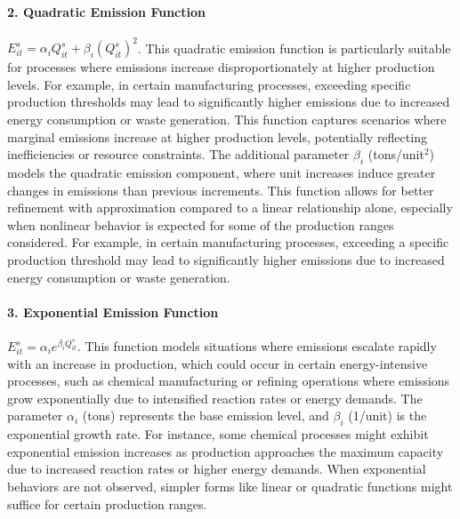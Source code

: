 \documentclass[final,3p,times,review,authoryear]{elsarticle}
\begin{document}
\paragraph{2. Quadratic Emission Function}
$E_{it}^s = \alpha_i Q_{it}^s + \beta_i (Q_{it}^s)^2$. This quadratic emission function is particularly suitable for processes where emissions increase disproportionately at higher production levels. For example, in certain manufacturing processes, exceeding specific production thresholds may lead to significantly higher emissions due to increased energy consumption or waste generation. This function captures scenarios where marginal emissions increase at higher production levels, potentially reflecting inefficiencies or resource constraints. The additional parameter $\beta_i$ (tons/unit$^2$) models the quadratic emission component, where unit increases induce greater changes in emissions than previous increments. This function allows for better refinement with approximation compared to a linear relationship alone, especially when nonlinear behavior is expected for some of the production ranges considered. For example, in certain manufacturing processes, exceeding a specific production threshold may lead to significantly higher emissions due to increased energy consumption or waste generation.

\paragraph{3. Exponential Emission Function}
$E_{it}^s = \alpha_i e^{\beta_i Q_{it}^s}$. This function models situations where emissions escalate rapidly with an increase in production, which could occur in certain energy-intensive processes, such as chemical manufacturing or refining operations where emissions grow exponentially due to intensified reaction rates or energy demands. The parameter $\alpha_i$ (tons) represents the base emission level, and $\beta_i$ (1/unit) is the exponential growth rate. For instance, some chemical processes might exhibit exponential emission increases as production approaches the maximum capacity due to increased reaction rates or higher energy demands. When exponential behaviors are not observed, simpler forms like linear or quadratic functions might suffice for certain production ranges.
\end{document}
